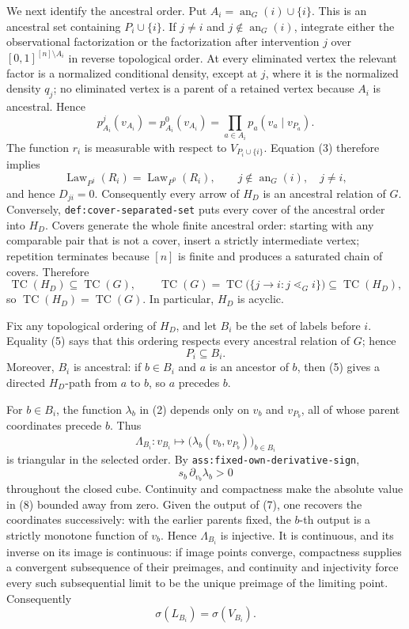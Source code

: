 We next identify the ancestral order.  Put \(A_i=\operatorname{an}_G(i)\cup\{i\}\).  This is an ancestral set containing \(P_i\cup\{i\}\).  If \(j\ne i\) and \(j\notin\operatorname{an}_G(i)\), integrate either the observational factorization or the factorization after intervention \(j\) over \([0,1]^{[n]\setminus A_i}\) in reverse topological order.  At every eliminated vertex the relevant factor is a normalized conditional density, except at \(j\), where it is the normalized density \(q_j\); no eliminated vertex is a parent of a retained vertex because \(A_i\) is ancestral.  Hence
\[
 p^j_{A_i}(v_{A_i})=p^0_{A_i}(v_{A_i})
 =\prod_{a\in A_i}p_a(v_a\mid v_{P_a}).
\tag{3}
\]
The function \(r_i\) is measurable with respect to \(V_{P_i\cup\{i\}}\).  Equation (3) therefore implies
\[
 \operatorname{Law}_{P^j}(R_i)=\operatorname{Law}_{P^0}(R_i),
 \qquad j\notin\operatorname{an}_G(i),\quad j\ne i,
\tag{4}
\]
and hence \(D_{ji}=0\).  Consequently every arrow of \(H_D\) is an ancestral relation of \(G\).  Conversely, \texttt{def:cover-separated-set} puts every cover of the ancestral order into \(H_D\).  Covers generate the whole finite ancestral order: starting with any comparable pair that is not a cover, insert a strictly intermediate vertex; repetition terminates because \([n]\) is finite and produces a saturated chain of covers.  Therefore
\[
 \operatorname{TC}(H_D)\subseteq\operatorname{TC}(G),
 \qquad
 \operatorname{TC}(G)
 =\operatorname{TC}\bigl(\{j\to i:j\lessdot_G i\}\bigr)
 \subseteq\operatorname{TC}(H_D),
\tag{5}
\]
so \(\operatorname{TC}(H_D)=\operatorname{TC}(G)\).  In particular, \(H_D\) is acyclic.

Fix any topological ordering of \(H_D\), and let \(B_i\) be the set of labels before \(i\).  Equality (5) says that this ordering respects every ancestral relation of \(G\); hence
\[
 P_i\subseteq B_i.
\tag{6}
\]
Moreover, \(B_i\) is ancestral: if \(b\in B_i\) and \(a\) is an ancestor of \(b\), then (5) gives a directed \(H_D\)-path from \(a\) to \(b\), so \(a\) precedes \(b\).

For \(b\in B_i\), the function \(\lambda_b\) in (2) depends only on \(v_b\) and \(v_{P_b}\), all of whose parent coordinates precede \(b\).  Thus
\[
 \Lambda_{B_i}:v_{B_i}\longmapsto
 \bigl(\lambda_b(v_b,v_{P_b})\bigr)_{b\in B_i}
\tag{7}
\]
is triangular in the selected order.  By \texttt{ass:fixed-own-derivative-sign},
\[
 s_b\,\partial_{v_b}\lambda_b>0
\tag{8}
\]
throughout the closed cube.  Continuity and compactness make the absolute value in (8) bounded away from zero.  Given the output of (7), one recovers the coordinates successively: with the earlier parents fixed, the \(b\)-th output is a strictly monotone function of \(v_b\).  Hence \(\Lambda_{B_i}\) is injective.  It is continuous, and its inverse on its image is continuous: if image points converge, compactness supplies a convergent subsequence of their preimages, and continuity and injectivity force every such subsequential limit to be the unique preimage of the limiting point.  Consequently
\[
 \sigma(L_{B_i})=\sigma(V_{B_i}).
\tag{9}
\]

